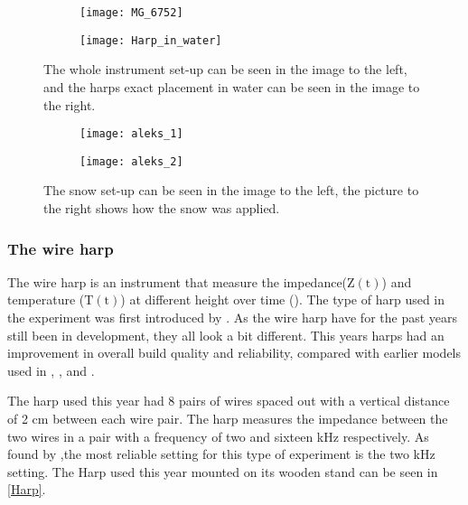 \begin{figure}[h!]
\centering
	\begin{subfigure}{0.4\linewidth}
		\centering
		\texttt{[image: MG\_6752]}
	\end{subfigure}\quad
	\begin{subfigure}{0.4\linewidth}
		\centering
		\texttt{[image: Harp\_in\_water]}
	\end{subfigure}
\caption{The whole instrument set-up can be seen in the image to the left, and the harps exact placement in water can be seen in the image to the right.}
\label{icehole1}
\end{figure}

\begin{figure}[h!]
\centering
	\begin{subfigure}{0.4\linewidth}
		\centering
		\texttt{[image: aleks\_1]}
	\end{subfigure}\quad
	\begin{subfigure}{0.4\linewidth}
		\centering
		\texttt{[image: aleks\_2]}
	\end{subfigure}
\caption{The snow set-up can be seen in the image to the left, the picture to the right shows how the snow was applied.}
\label{snowsite}
\end{figure}


\subsubsection{The wire harp}
The wire harp is an instrument that measure the impedance($\text{Z}(\text{t})$) and temperature ($\text{T}(\text{t})$) at different height over time (). The type of harp used in the experiment was first introduced by \textcite{Notz}. As the wire harp have for the past years still been in development, they all look a bit different. This years harps had an improvement in overall build quality and reliability, compared with earlier models used in \textcite{2017icegrowth}, \textcite{2016icegrowth}, and \textcite{2016snow}.

The harp used this year had 8 pairs of wires spaced out with a vertical distance of 2 cm between each wire pair. The harp measures the impedance between the two wires in a pair with a frequency of two and sixteen kHz respectively. As found by \textcite{Fuchs},the most reliable setting for this type of experiment is the two kHz setting. The Harp used this year mounted on its wooden stand can be seen in \autoref{Harp}.

